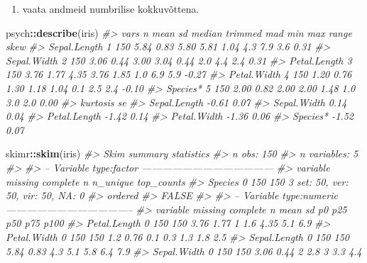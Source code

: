 \documentclass[]{book}
\newenvironment{Shaded}{\begin{snugshade}}{\end{snugshade}}
\newcommand{\KeywordTok}[1]{\textcolor[rgb]{0.13,0.29,0.53}{\textbf{#1}}}
\newcommand{\CommentTok}[1]{\textcolor[rgb]{0.56,0.35,0.01}{\textit{#1}}}
\newcommand{\OperatorTok}[1]{\textcolor[rgb]{0.81,0.36,0.00}{\textbf{#1}}}
\newcommand{\NormalTok}[1]{#1}
\providecommand{\tightlist}{%
  \setlength{\itemsep}{0pt}\setlength{\parskip}{0pt}}
\begin{document}
\begin{enumerate}
\def\labelenumi{\arabic{enumi}.}
\setcounter{enumi}{1}
\tightlist
\item
  vaata andmeid numbrilise kokkuvõttena.
\end{enumerate}

\begin{Shaded}
\begin{Highlighting}[]
\NormalTok{psych}\OperatorTok{::}\KeywordTok{describe}\NormalTok{(iris) }
\CommentTok{#>              vars   n mean   sd median trimmed  mad min max range  skew}
\CommentTok{#> Sepal.Length    1 150 5.84 0.83   5.80    5.81 1.04 4.3 7.9   3.6  0.31}
\CommentTok{#> Sepal.Width     2 150 3.06 0.44   3.00    3.04 0.44 2.0 4.4   2.4  0.31}
\CommentTok{#> Petal.Length    3 150 3.76 1.77   4.35    3.76 1.85 1.0 6.9   5.9 -0.27}
\CommentTok{#> Petal.Width     4 150 1.20 0.76   1.30    1.18 1.04 0.1 2.5   2.4 -0.10}
\CommentTok{#> Species*        5 150 2.00 0.82   2.00    2.00 1.48 1.0 3.0   2.0  0.00}
\CommentTok{#>              kurtosis   se}
\CommentTok{#> Sepal.Length    -0.61 0.07}
\CommentTok{#> Sepal.Width      0.14 0.04}
\CommentTok{#> Petal.Length    -1.42 0.14}
\CommentTok{#> Petal.Width     -1.36 0.06}
\CommentTok{#> Species*        -1.52 0.07}
\end{Highlighting}
\end{Shaded}

\begin{Shaded}
\begin{Highlighting}[]
\NormalTok{skimr}\OperatorTok{::}\KeywordTok{skim}\NormalTok{(iris) }
\CommentTok{#> Skim summary statistics}
\CommentTok{#>  n obs: 150 }
\CommentTok{#>  n variables: 5 }
\CommentTok{#> }
\CommentTok{#> -- Variable type:factor ---------------------------------------}
\CommentTok{#>  variable missing complete   n n_unique                       top_counts}
\CommentTok{#>   Species       0      150 150        3 set: 50, ver: 50, vir: 50, NA: 0}
\CommentTok{#>  ordered}
\CommentTok{#>    FALSE}
\CommentTok{#> }
\CommentTok{#> -- Variable type:numeric --------------------------------------}
\CommentTok{#>      variable missing complete   n mean   sd  p0 p25  p50 p75 p100}
\CommentTok{#>  Petal.Length       0      150 150 3.76 1.77 1   1.6 4.35 5.1  6.9}
\CommentTok{#>   Petal.Width       0      150 150 1.2  0.76 0.1 0.3 1.3  1.8  2.5}
\CommentTok{#>  Sepal.Length       0      150 150 5.84 0.83 4.3 5.1 5.8  6.4  7.9}
\CommentTok{#>   Sepal.Width       0      150 150 3.06 0.44 2   2.8 3    3.3  4.4}
\end{Highlighting}
\end{Shaded}
\end{document}
